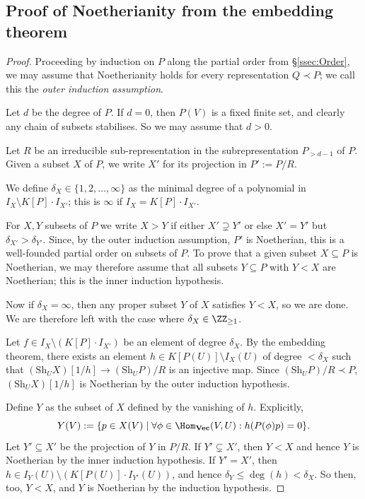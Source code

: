 \documentclass{amsart}
\renewcommand{\Vec}{\mathbf{Vec}}
\newcommand{\Sh}{\mathrm{Sh}}
\begin{document}
\subsection{Proof of Noetherianity from the embedding theorem}

\begin{proof}
Proceeding by induction on $P$ along the partial order from
\S\ref{ssec:Order}, we may assume that Noetherianity holds for every
representation $Q \prec P$; we call this the {\em outer induction
assumption}. 

Let $d$ be the degree of $P$. If $d=0$, then $P(V)$ is a fixed finite set,
and clearly any chain of subsets stabilises. So we may assume that $d>0$.

Let $R$ be an irreducible sub-representation in the subrepresentation
$P_{>d-1}$ of $P$. Given a subset $X$ of $P$, we write $X'$ for its
projection in $P':=P/R$.

We define $\delta_X \in \{1,2,\ldots,\infty\}$ as the minimal degree of
a polynomial in $I_X \setminus K[P] \cdot I_{X'}$; this is
$\infty$ if $I_X = K[P] \cdot I_{X'}$. 

For $X,Y$ subsets of $P$ we write $X > Y$ if either $X' \supsetneq Y'$ or
else $X'=Y'$ but $\delta_{X'}>\delta_{Y'}$. Since, by the outer induction
assumption, $P'$ is Noetherian, this is a well-founded partial order on
subsets of $P$.
To prove that a given subset $X \subseteq P$ is Noetherian, we may
therefore assume that all subsets $Y \subseteq P$ with $Y<X$ are
Noetherian; this is the inner induction hypothesis.

Now if $\delta_X=\infty$, then any proper subset $Y$ of $X$ satisfies
$Y<X$, so we are done. We are therefore left with the case where $\delta_X
\in \ZZ_{\geq 1}$. 

Let $f \in I_X \setminus (K[P] \cdot I_{X'})$ be an element of degree
$\delta_X$. By the embedding theorem, there exists an element $h \in
K[P(U)] \setminus I_{X}(U)$ of degree $<\delta_X$ such that $(\Sh_U
X)[1/h] \to (\Sh_U P)/R$ is an injective map. Since $(\Sh_U P)/R \prec
P$, $(\Sh_U X)[1/h]$ is Noetherian by the outer induction hypothesis.

Define $Y$ as the subset of $X$ defined by the vanishing of
$h$. Explicitly,
\[ Y(V):=\{p \in X(V) \mid \forall \phi \in \Hom_{\Vec}(V,U):
h(P(\phi)p)=0\}. \]
Let $Y' \subseteq X'$ be the projection of $Y$ in $P/R$. If
$Y' \subsetneq X'$, then $Y<X$ and hence $Y$ is Noetherian
by the inner induction hypothesis. If $Y'=X'$, then $h \in
I_Y(U) \setminus (K[P(U)] \cdot I_{Y'}(U))$, and hence $\delta_Y \leq
\deg(h) < \delta_X$. So then, too, $Y<X$, and $Y$ is
Noetherian by the induction hypothesis. 


\end{proof}
\end{document}
